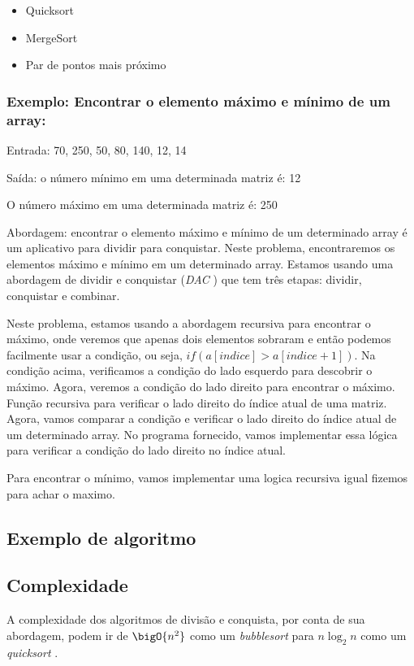 \begin{itemize}
    \item Quicksort
    \item MergeSort
    \item Par de pontos mais próximo
\end{itemize}

\subsubsection*{Exemplo: Encontrar o elemento máximo e mínimo de um array:}

Entrada: {70, 250, 50, 80, 140, 12, 14}

Saída: o número mínimo em uma determinada matriz é: 12

O número máximo em uma determinada matriz é: 250

Abordagem: encontrar o elemento máximo e mínimo de um determinado array é um aplicativo para dividir para conquistar. 
Neste problema, encontraremos os elementos máximo e mínimo em um determinado array. 
Estamos usando uma abordagem de dividir e conquistar (\emph{DAC} \cite{DivideAndConquer}) que tem três etapas: dividir, conquistar e combinar.

Neste problema, estamos usando a abordagem recursiva para encontrar o máximo, onde veremos que 
apenas dois elementos sobraram e então podemos facilmente usar a condição, ou seja, $if (a [indice]> a [indice + 1])$.
Na condição acima, verificamos a condição do lado esquerdo para descobrir o máximo. Agora, veremos a 
condição do lado direito para encontrar o máximo.
Função recursiva para verificar o lado direito do índice atual de uma matriz.
Agora, vamos comparar a condição e verificar o lado direito do índice atual de um determinado array.
No programa fornecido, vamos implementar essa lógica para verificar a condição do lado direito no índice atual.

Para encontrar o mínimo, vamos implementar uma logica recursiva igual fizemos para achar o maximo. 

\subsection{Exemplo de algoritmo}

\cite{DivideAndConquerAlgorithm}

\subsection{Complexidade}

A complexidade dos algoritmos de divisão e conquista, por conta de sua 
abordagem, podem ir de $\bigO{n^2}$ como um \emph{bubblesort}
para $n\log_2 n$ como um \emph{quicksort} \cite{DivideAndConquerComplexity}.
